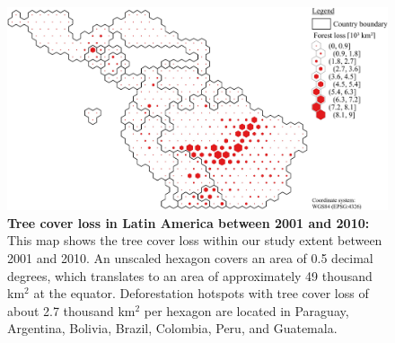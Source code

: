 			\begin{figure}[ht]
				\centering
				\includegraphics[scale=.85]{img/americas_loss_frameless}
				\caption[Tree cover loss in Latin America between 2001 and 2010]{\textbf{Tree cover loss in Latin America between 2001 and 2010:} This map shows the tree cover loss within our study extent between 2001 and 2010. An unscaled hexagon covers an area of 0.5 decimal degrees, which translates to an area of approximately 49 thousand km$^2$ at the equator. Deforestation hotspots with tree cover loss of about 2.7 thousand km$^2$ per hexagon are located in Paraguay, Argentina, Bolivia, Brazil, Colombia, Peru, and Guatemala.}
				\label{fig:americas_loss}
			\end{figure}

